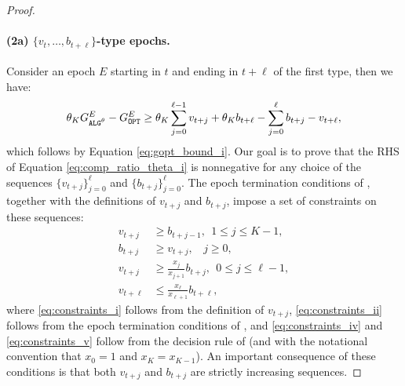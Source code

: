 \begin{proof}
    \paragraph{(2a) $\{v_t, \ldots, b_{t+\ell}\}$-type epochs.} Consider an epoch $E$ starting in $t$ and ending in $t+\ell$ of the first type, then we have:
    \begin{align}
    \label{eq:comp_ratio_theta_i}
        \theta_K\Galgtheta^E-\Gopt^E \ge \theta_K\sum_{j=0}^{\ell-1}v_{t+j} + \theta_K b_{t+\ell} - \sum_{j=0}^\ell b_{t+j} - v_{t+\ell},
    \end{align}
    which follows by Equation \eqref{eq:gopt_bound_i}. Our goal is to prove that the RHS of Equation \eqref{eq:comp_ratio_theta_i} is nonnegative for any choice of the sequences $\{v_{t+j}\}_{j=0}^\ell$ and $\{b_{t+j}\}_{j=0}^\ell$. The epoch termination conditions of \algtheta, together with the definitions of $v_{t+j}$ and $b_{t+j}$, impose a set of constraints on these sequences:
    \begin{align}
        v_{t+j}&\ge b_{t+j-1} ,~~ 1 \le j\le K-1, \label{eq:constraints_i}\\
        b_{t+j}&\ge v_{t+j},~~~~ j\ge 0, \label{eq:constraints_ii}\\
        v_{t+j} &\ge \frac{x_j}{x_{j+1}}b_{t+j},~~ 0 \le j \le \ell-1, \label{eq:constraints_iv} \\
        v_{t+\ell} &\le \frac{x_\ell}{x_{\ell+1}}b_{t+\ell}, \label{eq:constraints_v} 
    \end{align}
    where \eqref{eq:constraints_i} follows from the definition of $v_{t+j}$, \eqref{eq:constraints_ii} follows from the epoch termination conditions of \algtheta, and \eqref{eq:constraints_iv} and \eqref{eq:constraints_v} follow from the decision rule of \algtheta (and with the notational convention that $x_0=1$ and $x_K = x_{K-1}$). An important consequence of these conditions is that both $v_{t+j}$ and $b_{t+j}$ are strictly increasing sequences.


\end{proof}
